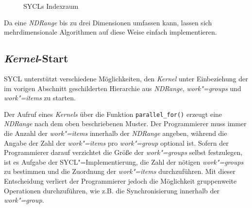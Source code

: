 \begin{figure}
    \caption[SYCLs Indexraum]{SYCLs Indexraum \cite[nach][25]{opencl2012}}
    \label{sycl:konzepte:abstraktion:ndrange}
\end{figure}

Da eine \textit{NDRange} bis zu drei Dimensionen umfassen kann, lassen sich
mehrdimensionale Algorithmen auf diese Weise einfach implementieren.

\subsection{\textit{Kernel}-Start}
\label{sycl:konzepte:kernelstart}

SYCL unterstützt verschiedene Möglichkeiten, den \textit{Kernel} unter
Einbeziehung der im vorigen Abschnitt geschilderten Hierarchie aus
\textit{NDRange}, \textit{work"=groups} und \textit{work"=items} zu starten.

Der Aufruf eines \textit{Kernels} über die Funktion \texttt{parallel\_for()}
erzeugt eine \textit{NDRange} nach dem oben beschriebenen Muster. Der
Programmierer muss immer die Anzahl der \textit{work"=items} innerhalb der
\textit{NDRange} angeben, während die Angabe der Zahl der \textit{work"=items}
pro \textit{work"=group} optional ist. Sofern der Programmierer darauf
verzichtet die Größe der \textit{work"=groups} selbst festzulegen, ist es
Aufgabe der SYCL"=Implementierung, die Zahl der nötigen \textit{work"=groups} zu
bestimmen und die Zuordnung der \textit{work"=items} durchzuführen. Mit dieser
Entscheidung verliert der Programmierer jedoch die Möglichkeit gruppenweite
Operationen durchzuführen, wie z.B. die Synchronisierung innerhalb der
\textit{work"=group}.

